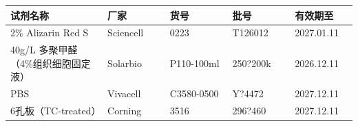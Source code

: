 \documentclass[UTF8,10pt,a4paper,fontset=fandol]{ctexart}
\newcommand{\fieldvalue}[1]{#1}
\newcommand{\handwritten}[1]{#1}
\begin{document}
\begin{tabular}{|p{0.28\linewidth}|p{0.18\linewidth}|p{0.18\linewidth}|p{0.18\linewidth}|p{0.18\linewidth}|}
\hline
试剂名称 & 厂家 & 货号 & 批号 & 有效期至\\
\hline
\fieldvalue{2\% Alizarin Red S} &
\fieldvalue{Sciencell} &
\fieldvalue{0223} &
\fieldvalue{\handwritten{T126012}} &
\fieldvalue{\handwritten{2027.01.11}}\\
\hline
\fieldvalue{40g/L 多聚甲醛（4\%组织细胞固定液）} &
\fieldvalue{Solarbio} &
\fieldvalue{P110-100ml} &
\fieldvalue{\handwritten{250?200k}} &
\fieldvalue{\handwritten{2026.12.11}}\\
\hline
\fieldvalue{PBS} &
\fieldvalue{Vivacell} &
\fieldvalue{C3580-0500} &
\fieldvalue{\handwritten{Y?4472}} &
\fieldvalue{\handwritten{2027.12.11}}\\
\hline
\fieldvalue{6孔板（TC-treated）} &
\fieldvalue{Corning} &
\fieldvalue{3516} &
\fieldvalue{\handwritten{296?460}} &
\fieldvalue{\handwritten{2027.12.11}}\\
\hline
\end{tabular}
\end{document}
